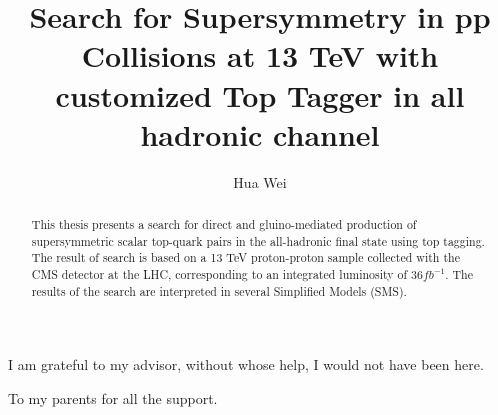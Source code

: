 \documentclass[oneside,final,letterpaper]{ucr}
\begin{document}

\title{Search for Supersymmetry in pp Collisions at 13 TeV with customized Top Tagger in all hadronic channel}
\author{Hua Wei}

\maketitle
\copyrightpage{}
\approvalpage{}

\begin{frontmatter}

\begin{acknowledgements}
I am grateful to my advisor, without whose help, I would not have been here.
\end{acknowledgements}
\begin{dedication}
\null\vfil
{\large
\begin{center}
To my parents for all the support.
\end{center}
}
\vfil\null
\end{dedication}
\begin{abstract}
This thesis presents a search for direct and gluino-mediated production of supersymmetric scalar top-quark pairs in the all-hadronic final state using top tagging. The result of search is based on a 13 TeV proton-proton sample collected with the CMS detector at the LHC, corresponding to an integrated luminosity of $36 fb^{-1}$. The results of the search are interpreted in several Simplified Models (SMS).
\end{abstract}
\tableofcontents
\listoffigures
\listoftables
\end{frontmatter}








\nocite{*}
% 




\end{document}
